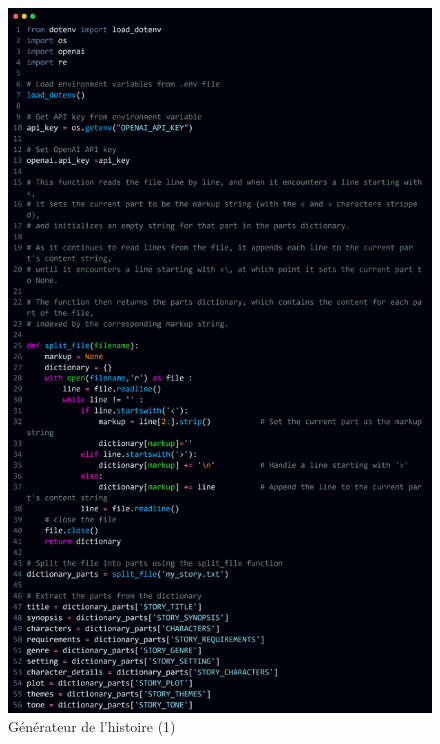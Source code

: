 \documentclass[11,5pt]{report}
\begin{document}
\begin{spacing}{2}
\begin{spacing}{2}
\begin{figure}[htbp]
    \centering
    \includegraphics[keepaspectratio=true,scale=0.2]{images/creationScript1.png}
    \caption{Générateur de l'histoire (1)}
    \label{fig:generator1}
\end{figure}


\end{spacing}
\end{spacing}
\end{document}
